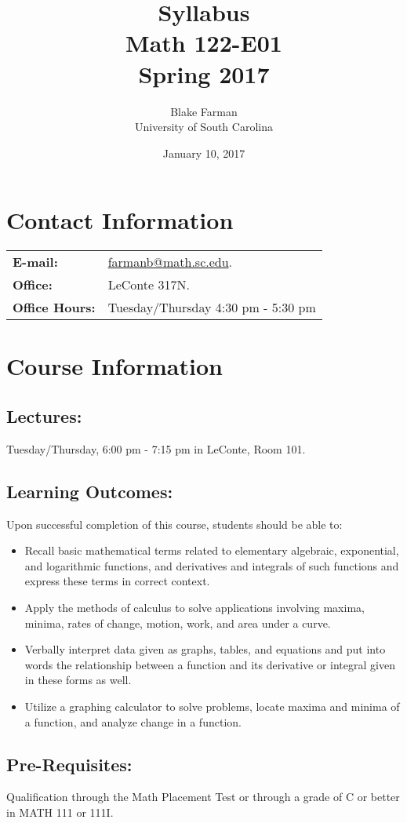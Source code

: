 \documentclass[10pt]{amsart}
\author{Blake Farman\\University of South Carolina}
\title{Syllabus\\Math 122-E01\\Spring 2017}
\date{January 10, 2017}
\begin{document}
\maketitle

\section*{Contact Information}
\noindent
\begin{tabular}{p{.9in}p{5in}}
  \textbf{E-mail:} &\href{mailto:farmanb@math.sc.edu}{farmanb@math.sc.edu}.\\
  \textbf{Office:} & LeConte 317N.\\
  \textbf{Office Hours:} & Tuesday/Thursday 4:30 pm - 5:30 pm
\end{tabular}

\section*{Course Information}
\noindent
\subsection*{Lectures:}
Tuesday/Thursday,  6:00 pm - 7:15 pm in LeConte, Room 101.
\subsection*{Learning Outcomes:} 
Upon successful completion of this course, students should be able to:
\begin{itemize}
\item
  Recall basic mathematical terms related to elementary algebraic, exponential, and logarithmic functions, and derivatives and integrals of such functions and express these terms in correct context.
\item
  Apply the methods of calculus to solve applications involving maxima, minima, rates of change, motion, work, and area under a curve.
\item
  Verbally interpret data given as graphs, tables, and equations and put into words the relationship between a function and its derivative or integral given in these forms as well.
\item
  Utilize a graphing calculator to solve problems, locate maxima and minima of a function, and analyze change in a function.
\end{itemize}

\subsection*{Pre-Requisites:} 
Qualification through the Math Placement Test or through a grade of C or better in MATH 111 or 111I.
\end{document}
